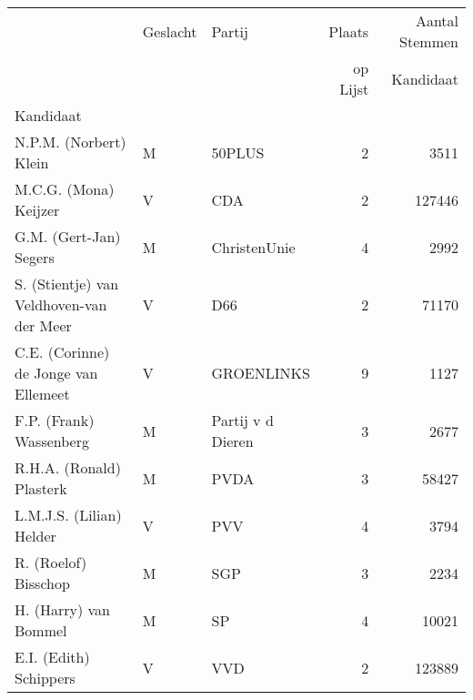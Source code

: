 \begin{tabular}{lllrr}
\toprule
{} & Geslacht &                 Partij &  Plaats   &  Aantal Stemmen  \\
 & & & op Lijst & Kandidaat\\
Kandidaat                                &          &                        &                  &                           \\
\midrule
N.P.M. (Norbert) Klein                   &        M &                 50PLUS &                2 &                      3511 \\
M.C.G. (Mona) Keijzer                    &        V &                    CDA &                2 &                    127446 \\
G.M. (Gert-Jan) Segers                   &        M &           ChristenUnie &                4 &                      2992 \\
S. (Stientje) van Veldhoven-van der Meer &        V &                    D66 &                2 &                     71170 \\
C.E. (Corinne) de Jonge van Ellemeet     &        V &             GROENLINKS &                9 &                      1127 \\
F.P. (Frank) Wassenberg                  &        M &  Partij v d Dieren &                3 &                      2677 \\
R.H.A. (Ronald) Plasterk                 &        M &                   PVDA &                3 &                     58427 \\
L.M.J.S. (Lilian) Helder                 &        V &                    PVV &                4 &                      3794 \\
R. (Roelof) Bisschop                     &        M &                    SGP &                3 &                      2234 \\
H. (Harry) van Bommel                    &        M &                     SP &                4 &                     10021 \\
E.I. (Edith) Schippers                   &        V &                    VVD &                2 &                    123889 \\
\bottomrule
\end{tabular}
